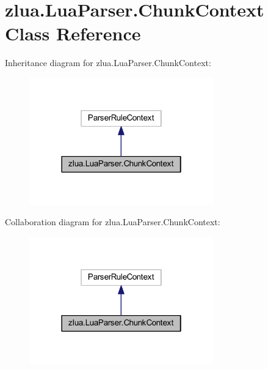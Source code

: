 \hypertarget{classzlua_1_1_lua_parser_1_1_chunk_context}{}\section{zlua.\+Lua\+Parser.\+Chunk\+Context Class Reference}
\label{classzlua_1_1_lua_parser_1_1_chunk_context}


Inheritance diagram for zlua.\+Lua\+Parser.\+Chunk\+Context\+:
\nopagebreak
\begin{figure}[H]
\begin{center}
\leavevmode
\includegraphics[width=226pt]{classzlua_1_1_lua_parser_1_1_chunk_context__inherit__graph}
\end{center}
\end{figure}


Collaboration diagram for zlua.\+Lua\+Parser.\+Chunk\+Context\+:
\nopagebreak
\begin{figure}[H]
\begin{center}
\leavevmode
\includegraphics[width=226pt]{classzlua_1_1_lua_parser_1_1_chunk_context__coll__graph}
\end{center}
\end{figure}
